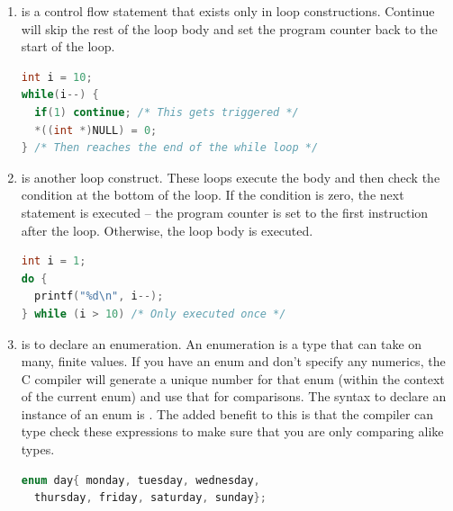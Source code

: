 \begin{enumerate}
	      But, it is important to know that this is a compiler imposed restriction only.
        There are ways of getting around this, and the program will run fine with defined behavior.
        In systems programming, the only type of memory that you can't write to is system write-protected memory.

\begin{lstlisting}[language=C]
const int i = 0; // Same as "int const i = 0"
(*((int *)&i)) = 1; // i == 1 now
const char *ptr = "hi";
*ptr = '\0'; // Will cause a Segmentation Violation
\end{lstlisting}

	    \item {} is a control flow statement that exists only in loop constructions.
        Continue will skip the rest of the loop body and set the program counter back to the start of the loop.

\begin{lstlisting}[language=C]
int i = 10;
while(i--) {
  if(1) continue; /* This gets triggered */
  *((int *)NULL) = 0;
} /* Then reaches the end of the while loop */
\end{lstlisting}

	    \item {} is another loop construct.
        These loops execute the body and then check the condition at the bottom of the loop.
        If the condition is zero, the next statement is executed -- the program counter is set to the first instruction after the loop.
        Otherwise, the loop body is executed.

\begin{lstlisting}[language=C]
int i = 1;
do {
  printf("%d\n", i--);
} while (i > 10) /* Only executed once */
\end{lstlisting}

	    \item {} is to declare an enumeration.
        An enumeration is a type that can take on many, finite values.
        If you have an enum and don't specify any numerics, the C compiler will generate a unique number for that enum (within the context of the current enum) and use that for comparisons.
        The syntax to declare an instance of an enum is .
        The added benefit to this is that the compiler can type check these expressions to make sure that you are only comparing alike types.

\begin{lstlisting}[language=C]
enum day{ monday, tuesday, wednesday,
  thursday, friday, saturday, sunday};


\end{lstlisting}
\end{enumerate}
